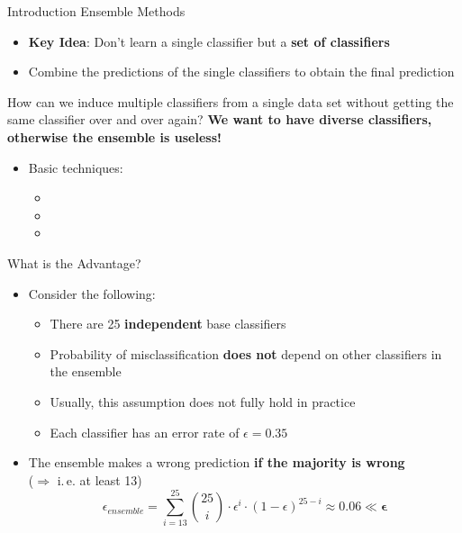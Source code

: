 \begin{frame}{Introduction Ensemble Methods}{}
	\begin{itemize}
		\item \textbf{Key Idea}: Don't learn a single classifier but a \textbf{set of classifiers}
		\item Combine the predictions of the single classifiers to obtain the final prediction
	\end{itemize}
		
	\begin{boxBlue}
		\footnotesize
		 How can we induce multiple classifiers from a single data set without getting
		the same classifier over and over again? \textbf{We want to have diverse classifiers,
		otherwise the ensemble is useless!}	
	\end{boxBlue}
		
	\begin{itemize}
		\item Basic techniques:
		\begin{itemize}
			\item {}
			\item {}
			\item {}
		\end{itemize}
	\end{itemize}
\end{frame}


\begin{frame}{What is the Advantage?}{}
	\begin{itemize}
		\item Consider the following:
		\begin{itemize}
			\item There are 25 \textbf{independent} base classifiers
			\item {}
				Probability of misclassification \textbf{does not} depend on other classifiers in the ensemble
			\item Usually, this assumption does not fully hold in practice
			\item Each classifier has an error rate of $\epsilon = 0.35$
		\end{itemize}
		\item The ensemble makes a wrong prediction \textbf{if the majority is wrong} \\
			($\Rightarrow$ i.\,e. at least 13)
		\begin{equation}
			\epsilon_{ensemble}
				= \sum_{i=13}^{25} \binom{25}{i} \cdot \epsilon^i \cdot (1 - \epsilon)^{25 - i}
				\approx \bm{0.06 \ll \epsilon}
		\end{equation}
	\end{itemize}
\end{frame}


